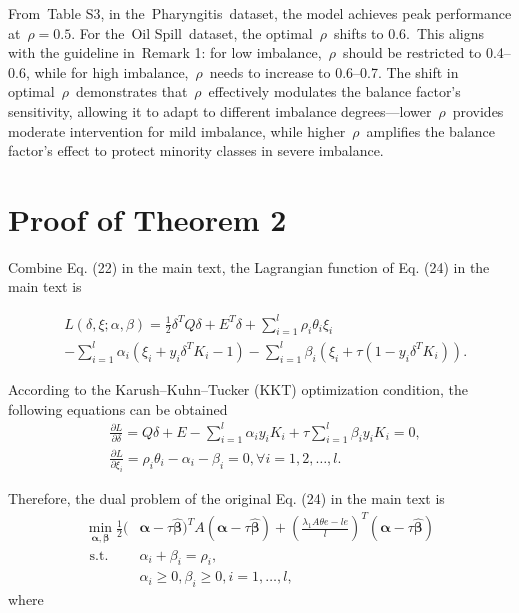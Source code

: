 \documentclass[fleqn,10pt]{wlscirepp}
\begin{document}
{From Table S3, in the Pharyngitis dataset, the model achieves peak performance at \(\rho=0.5\). For the Oil Spill dataset, the optimal \(\rho\) shifts to 0.6. This aligns with the guideline in Remark 1: for low imbalance, \(\rho\) should be restricted to 0.4–0.6, while for high imbalance, \(\rho\) needs to increase to 0.6–0.7. The shift in optimal \(\rho\) demonstrates that \(\rho\) effectively modulates the balance factor’s sensitivity, allowing it to adapt to different imbalance degrees—lower \(\rho\) provides moderate intervention for mild imbalance, while higher \(\rho\) amplifies the balance factor’s effect to protect minority classes in severe imbalance.
}


\clearpage
\section{Proof of Theorem 2}\label{Item 4}

Combine Eq. (22) in the main text, the Lagrangian function of Eq. (24) in the main text is

\begin{equation}
\begin{aligned}
\label{laa}
&L(\delta,\xi ;\alpha ,\beta ) = \frac{1}{2}{\delta ^T}Q\delta  + {E^T}\delta  + \sum\limits_{i = 1}^{l} \rho_{i}\theta_{i} \xi _{i} \\
 &- \sum\limits_{i = 1}^l {{\alpha _i}({\xi _i} + {y_i}{\delta ^T}{K_i} - 1)}- \sum\limits_{i = 1}^l {{\beta _i}({\xi _i} + \tau (1 - {y_i}{\delta ^T}{K_i}))} .
\end{aligned}
\end{equation}

According to the Karush–Kuhn–Tucker (KKT) optimization condition, the following equations can be obtained
\begin{equation}
\label{kkt}
\begin{aligned}
&\frac{\partial L}{\partial \delta}=Q \delta+E-\sum_{i=1}^{l} \alpha_{i} y_{i} K_{i}+\tau \sum_{i=1}^{l} \beta_{i} y_{i} K_{i}=0, \\
&\frac{\partial L}{\partial \xi_{i}}=\rho_{i}\theta_{i}-\alpha_{i}-\beta_{i}=0, \forall i=1,2, \ldots, l .
\end{aligned}
\end{equation}

Therefore, the dual problem of the original Eq. (24) in the main text  is
\begin{equation}
\label{opti}
\begin{aligned}
\min _{\boldsymbol{\alpha, \beta}} \frac{1}{2}( & \boldsymbol{\alpha}-\tau \boldsymbol{\hat{\beta}})^{T} A(\boldsymbol{\alpha}-\tau \boldsymbol{\hat{\beta}})+\left(\frac{\lambda_{1} A\mathbb{\theta}e-l e}{l}\right)^{T}(\boldsymbol{\alpha}-\tau \boldsymbol{\hat{\beta}}) \\
\text { s.t. } \quad & \alpha_{i}+\beta_{i}=\rho_{i}, \\
& \alpha_{i} \geq 0, \beta_{i} \geq 0, i=1, \ldots, l,
\end{aligned}
\end{equation}
where 
\end{document}
